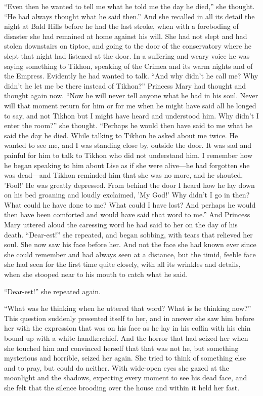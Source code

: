 ``Even then he wanted to tell me what he told me the day he
died,'' she thought. ``He had always thought what he said then.''
And she recalled in all its detail the night at Bald Hills before
he had the last stroke, when with a foreboding of disaster she
had remained at home against his will. She had not slept and had
stolen downstairs on tiptoe, and going to the door of the
conservatory where he slept that night had listened at the
door. In a suffering and weary voice he was saying something to
Tikhon, speaking of the Crimea and its warm nights and of the
Empress.  Evidently he had wanted to talk. ``And why didn't he
call me? Why didn't he let me be there instead of Tikhon?''
Princess Mary had thought and thought again now. ``Now he will
never tell anyone what he had in his soul. Never will that moment
return for him or for me when he might have said all he longed to
say, and not Tikhon but I might have heard and understood
him. Why didn't I enter the room?'' she thought. ``Perhaps he
would then have said to me what he said the day he died. While
talking to Tikhon he asked about me twice. He wanted to see me,
and I was standing close by, outside the door. It was sad and
painful for him to talk to Tikhon who did not understand him. I
remember how he began speaking to him about Lise as if she were
alive---he had forgotten she was dead---and Tikhon reminded him
that she was no more, and he shouted, 'Fool!' He was greatly
depressed. From behind the door I heard how he lay down on his
bed groaning and loudly exclaimed, 'My God!' Why didn't I go in
then? What could he have done to me? What could I have lost? And
perhaps he would then have been comforted and would have said
that word to me.'' And Princess Mary uttered aloud the caressing
word he had said to her on the day of his death. ``Dear-est!''
she repeated, and began sobbing, with tears that relieved her
soul. She now saw his face before her. And not the face she had
known ever since she could remember and had always seen at a
distance, but the timid, feeble face she had seen for the first
time quite closely, with all its wrinkles and details, when she
stooped near to his mouth to catch what he said.

``Dear-est!'' she repeated again.

``What was he thinking when he uttered that word? What is he
thinking now?'' This question suddenly presented itself to her,
and in answer she saw him before her with the expression that was
on his face as he lay in his coffin with his chin bound up with a
white handkerchief. And the horror that had seized her when she
touched him and convinced herself that that was not he, but
something mysterious and horrible, seized her again. She tried to
think of something else and to pray, but could do neither. With
wide-open eyes she gazed at the moonlight and the shadows,
expecting every moment to see his dead face, and she felt that
the silence brooding over the house and within it held her fast.

